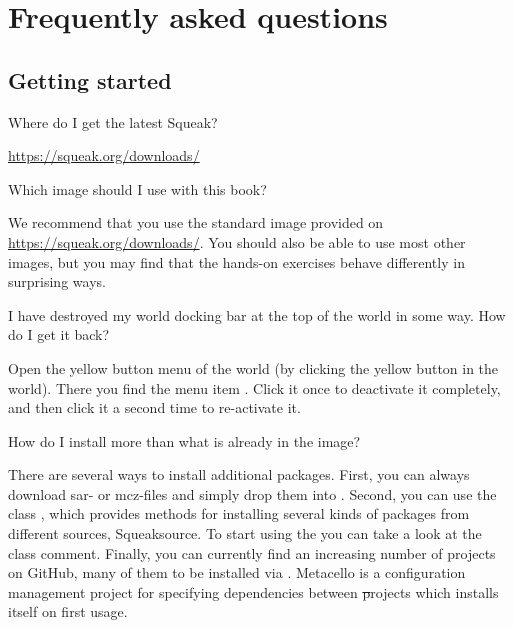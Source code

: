 \documentclass[a4paper,10pt,twoside]{book}
\begin{document}
	\renewcommand{\nnbb}[2]{} %
\fi
\chapter{Frequently asked questions}
\label{app:faq}


\section{Getting started}
\begin{faq}
Where do I get the latest Squeak?
\end{faq}
\answer
\url{https://squeak.org/downloads/}

\begin{faq}
Which \sq image should I use with this book?
\end{faq}
\answer
We recommend that you use the standard image provided on \url{https://squeak.org/downloads/}.
You should also be able to use most other images, but you may find that the hands-on exercises behave differently in surprising ways.

\begin{faq}
I have destroyed my world docking bar at the top of the world in some way.
How do I get it back?
\end{faq}
\answer
Open the yellow button menu of the world (by clicking the yellow button in the world).
There you find the menu item .
Click it once to deactivate it completely, and then click it a second time to re-activate it.

\begin{faq}
How do I install more than what is already in the image?
\end{faq}
\answer
There are several ways to install additional packages.
First, you can always download sar- or mcz-files and simply drop them into \sq.
Second, you can use the class , which provides methods for installing several kinds of packages from different sources, \eg Squeaksource.
To start using the  you can take a look at the class comment.
Finally, you can currently find an increasing number of \sq projects on GitHub, many of them to be installed via .
Metacello is a configuration management project for specifying dependencies between \st projects which installs itself on first usage.
\end{document}

